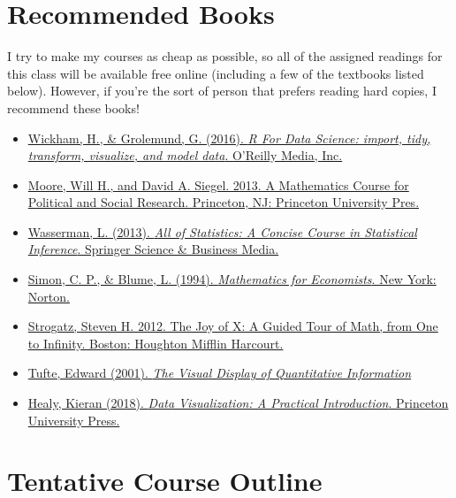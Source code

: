 \documentclass[11pt, letterpaper]{article}
\begin{document}
\section*{Recommended Books}
I try to make my courses as cheap as possible, so all of the assigned readings for this class will be available free online (including a few of the textbooks listed below). However, if you're the sort of person that prefers reading hard copies, I recommend these books!

\begin{itemize}
\item \href{https://r4ds.had.co.nz/}{Wickham, H., \& Grolemund, G. (2016). \textit{R For Data Science: import, tidy, transform, visualize, and model data}. O'Reilly Media, Inc.}

\item \href{https://ebookcentral.proquest.com/lib/ugalib/detail.action?pq-origsite=primo&docID=1205618}{Moore, Will H., and David A. Siegel. 2013. A Mathematics Course for Political and Social Research. Princeton, NJ: Princeton University Pres.}


\item \href{https://www.amazon.com/All-Statistics-Statistical-Inference-Springer/dp/1441923225}{Wasserman, L. (2013). \textit{All of Statistics: A Concise Course in Statistical Inference}. Springer Science \& Business Media.}
\item \href{https://www.amazon.com/Mathematics-Economists-Carl-P-Simon/dp/0393957330}{Simon, C. P., \& Blume, L. (1994). \textit{Mathematics for Economists}. New York: Norton.}
\item \href{https://ebookcentral.proquest.com/lib/ugalib/reader.action?docID=3304559}{Strogatz, Steven H. 2012. The Joy of X: A Guided Tour of Math, from One to Infinity. Boston: Houghton Mifflin Harcourt.}
\item \href{https://www.amazon.com/Visual-Display-Quantitative-Information/dp/1930824130}{Tufte, Edward (2001). \textit{The Visual Display of Quantitative Information}}
\item \href{https://socviz.co/}{Healy, Kieran (2018). \textit{Data Visualization: A Practical Introduction}. Princeton University Press.} 
\end{itemize} 



\section*{Tentative Course Outline}
\end{document}
